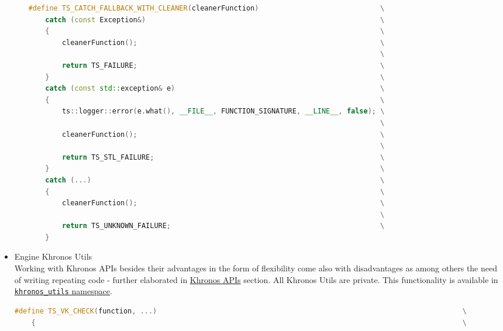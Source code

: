 \begin{itemize}
\begin{itemize}
\begin{lstlisting}[language=c++, caption=Private Engine Utils (./engine/src/internal\_utils.h)]
#define TS_CATCH_FALLBACK_WITH_CLEANER(cleanerFunction)                             \
    catch (const Exception&)                                                        \
    {                                                                               \
        cleanerFunction();                                                          \
                                                                                    \
        return TS_FAILURE;                                                          \
    }                                                                               \
    catch (const std::exception& e)                                                 \
    {                                                                               \
        ts::logger::error(e.what(), __FILE__, FUNCTION_SIGNATURE, __LINE__, false); \
                                                                                    \
        cleanerFunction();                                                          \
                                                                                    \
        return TS_STL_FAILURE;                                                      \
    }                                                                               \
    catch (...)                                                                     \
    {                                                                               \
        cleanerFunction();                                                          \
                                                                                    \
        return TS_UNKNOWN_FAILURE;                                                  \
    }
\end{lstlisting}
    \end{itemize}
    \item Engine Khronos Utils\\
    \label{sec:khronos_utils}
    Working with Khronos APIs besides their advantages in the form of flexibility come also with disadvantages as among others the need of writing repeating code - further elaborated in \hyperref[sec:registry]{Khronos APIs} section. All Khronos Utils are private.
    This functionality is available in \hyperref[sec:namespaces]{\texttt{khronos\_utils} namespace}.
\begin{lstlisting}[language=c++, caption=Khronos Utils (./engine/src/khronos\_utils.h)]
#define TS_VK_CHECK(function, ...)                                                                         \
    {                                                                                                      \

\end{lstlisting}
\end{itemize}
